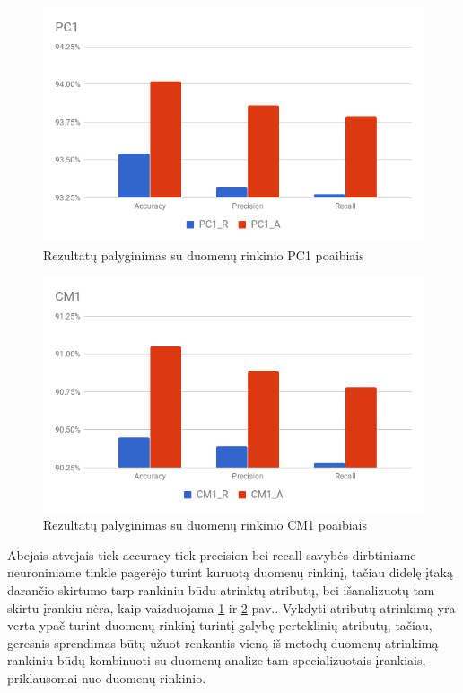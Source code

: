 \documentclass{VUMIFPSbakalaurinis}
\begin{document}
\begin{figure}[H]
    \centering
    \includegraphics[scale=0.5]{img/chart-3}
    \caption{Rezultatų palyginimas su duomenų rinkinio PC1 poaibiais}
    \label{img:chart3}
\end{figure}

\begin{figure}[H]
    \centering
    \includegraphics[scale=0.5]{img/chart-4}
    \caption{Rezultatų palyginimas su duomenų rinkinio CM1 poaibiais}
    \label{img:chart4}
\end{figure}

Abejais atvejais tiek accuracy tiek precision bei recall savybės dirbtiniame neuroniniame tinkle pagerėjo turint kuruotą duomenų rinkinį, tačiau didelę įtaką darančio skirtumo tarp rankiniu būdu atrinktų atributų, bei išanalizuotų tam skirtu įrankiu nėra, kaip vaizduojama \ref{img:chart3} ir \ref{img:chart4} pav.. Vykdyti atributų atrinkimą yra verta ypač turint duomenų rinkinį turintį galybę perteklinių atributų, tačiau, geresnis sprendimas būtų užuot renkantis vieną iš metodų duomenų atrinkimą rankiniu būdų kombinuoti su duomenų analize tam specializuotais įrankiais, priklausomai nuo duomenų rinkinio. 
\end{document}
